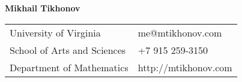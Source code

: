 \documentclass[letterpaper,10pt,oneside,utf8]{article}
\begin{document}
	

	
	\noindent  \LARGE{\textbf{Mikhail Tikhonov}}  \\
	\vspace{-2ex}
	\normalsize
	
	\begin{center}
		\begin{tabular}{l l}
			University of Virginia& \hspace{2.8in} 
			{me@mtikhonov.com} \\
			School of Arts and Sciences & \hspace{2.8in} +7 915 259-3150 \\
			Department of Mathematics &\hspace{2.8in} http://mtikhonov.com \\
			 
		\end{tabular}
	\end{center}
	
\end{document}
